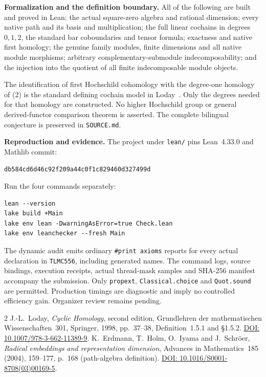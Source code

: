 \documentclass[10pt]{article}
\begin{document}
\textbf{Formalization and the definition boundary.}
All of the following are built and proved in Lean: the actual square-zero
algebra and rational dimension; every native path and its basis and
multiplication; the full linear cochains in degrees $0,1,2$, the standard
bar coboundaries and tensor formula; exactness and native first homology;
the genuine family modules, finite dimensions and all native module
morphisms; arbitrary complementary-submodule indecomposability; and the
injection into the quotient of all finite indecomposable module objects.

The identification of first Hochschild cohomology with the degree-one
homology of (2) is the standard defining cochain model in
Loday~\cite[Definition~1.5.1 and \S1.5.2]{Loday}. Only the degrees needed for
that homology are constructed. No higher Hochschild group or general
derived-functor comparison theorem is asserted. The complete bilingual
conjecture is preserved in \texttt{SOURCE.md}.

\textbf{Reproduction and evidence.}
The project under \texttt{lean/} pins Lean~4.33.0 and Mathlib commit:
\begin{center}
{\footnotesize\texttt{db584cd6d46c92f209a44c0f1c829460d327499d}}
\end{center}
Run the four commands separately:
\begin{verbatim}
lean --version
lake build +Main
lake env lean -DwarningAsError=true Check.lean
lake env leanchecker --fresh Main
\end{verbatim}
The dynamic audit emits ordinary \texttt{\#print axioms} reports for every
actual declaration in \texttt{TLMC556}, including generated names. The
command logs, source bindings, execution receipts, actual thread-mask
samples and SHA-256 manifest accompany the submission. Only
\texttt{propext}, \texttt{Classical.choice} and \texttt{Quot.sound} are permitted.
Production timings are diagnostic and imply no controlled efficiency gain.
Organizer review remains pending.

\begin{thebibliography}{2}\small
{} J.-L.~Loday, \emph{Cyclic Homology}, second edition,
Grundlehren der mathematischen Wissenschaften~301, Springer, 1998,
pp.~37--38, Definition~1.5.1 and \S1.5.2.
\href{https://doi.org/10.1007/978-3-662-11389-9}{DOI: 10.1007/978-3-662-11389-9}.
 K.~Erdmann, T.~Holm, O.~Iyama and J.~Schr\"oer,
\emph{Radical embeddings and representation dimension},
Advances in Mathematics~185 (2004), 159--177, p.~168 (path-algebra definition).
\href{https://doi.org/10.1016/S0001-8708(03)00169-5}{DOI: 10.1016/S0001-8708(03)00169-5}.
\end{thebibliography}
\end{document}
